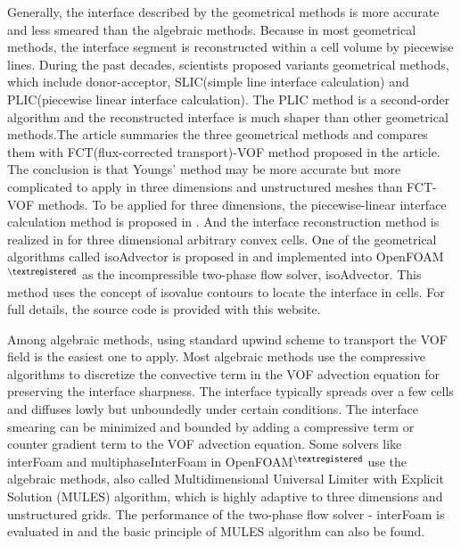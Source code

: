Generally, the interface described by the geometrical methods is more accurate and less smeared than the algebraic methods. Because in most geometrical methods, the interface segment is reconstructed within a cell volume by piecewise lines. During the past decades, scientists proposed variants geometrical methods, which include donor-acceptor\cite{hirt1981volume}, SLIC(simple line interface calculation)\cite{NohAndWoodward1976} and PLIC(piecewise linear interface calculation)\cite{Youngs1982}. The PLIC method is a second-order algorithm and the reconstructed interface is much shaper than other geometrical methods.The article\cite{rudman1997volume} summaries the three geometrical methods and compares them with FCT(flux-corrected transport)-VOF method proposed in the article. The conclusion is that Youngs' method\cite{Youngs1982} may be more accurate but more complicated to apply in three dimensions and unstructured meshes than FCT-VOF methods. To be applied for three dimensions, the piecewise-linear interface calculation method is proposed in \cite{Gueyffier1999Volume}. And the interface reconstruction method is realized in \cite{diot2016interface} for three dimensional arbitrary convex cells. One of the geometrical algorithms called isoAdvector is proposed in \cite{roenby2016computational} and implemented into OpenFOAM$^{\textregistered}$ as the incompressible two-phase flow solver, isoAdvector. This method uses the concept of isovalue contours to locate the interface in cells. For full details, the source code is provided with this website\cite{isoAdvector}.

Among algebraic methods, using standard upwind scheme to transport the VOF field is the easiest one to apply. Most algebraic methods use the compressive algorithms to discretize the convective term in the VOF advection equation for preserving the interface sharpness. The interface typically spreads over a few cells and diffuses lowly but unboundedly under certain conditions\cite{Ubbink1997}. The interface smearing can be minimized and bounded by adding a compressive term or counter gradient term to the VOF advection equation\cite{weller2008new}. Some solvers like interFoam and multiphaseInterFoam in OpenFOAM$^{\textregistered}$ use the algebraic methods, also called Multidimensional Universal Limiter with Explicit Solution (MULES) algorithm, which is highly adaptive to three dimensions and unstructured grids. The performance of the two-phase flow solver - interFoam is evaluated in \cite{deshpande2012evaluating} and the basic principle of MULES algorithm can also be found.

